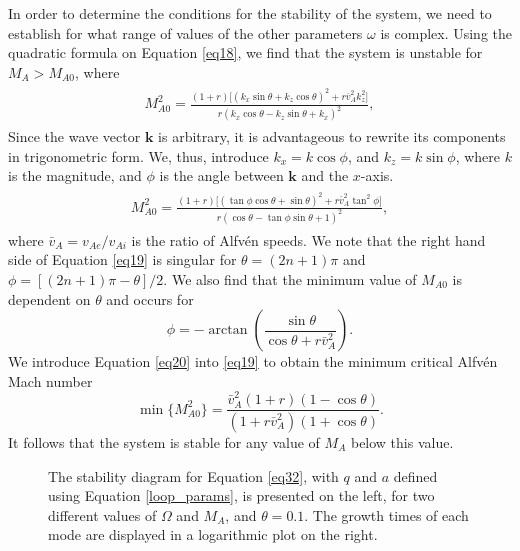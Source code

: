\documentclass[12pt]{ociamthesis}
\begin{document}
In order to determine the conditions for the stability of the system, we need to establish for what range of values of the other parameters $\omega$ is complex.
Using the quadratic formula on Equation \eqref{eq18}, we find that the system is unstable for $M_A > M_{A0}$, where
\begin{align}
\begin{split}
\label{eq18-1}
M_{A0}^2 = \frac{
(1 + r)
\big[ \left( k_x \sin\theta
+ k_z \cos\theta \right)^2
+ r \bar v_{A}^2 k_z^2 \big]
}{
r \left( k_x \cos\theta - k_z \sin\theta + k_x \right)^2
},
\end{split}
\end{align}
Since the wave vector $\mathbf{k}$ is arbitrary, it is advantageous to rewrite its components in trigonometric form.
We, thus, introduce $k_x = k \cos\phi$, and $k_z = k \sin\phi$, where $k$ is the magnitude, and $\phi$ is the angle between $\mathbf{k}$ and the $x$-axis.
\begin{align}
\begin{split}
\label{eq19}
M_{A0}^2 = \frac{
(1 + r)
\big[ \left( \tan\phi \cos\theta
+ \sin\theta \right)^2 + r \bar v_{A}^2 \tan^2\phi \big]
}{
r
\left( \cos\theta - \tan\phi \sin\theta + 1 \right)^2
},
\end{split}
\end{align}
where $\bar v_A = v_{Ae} / v_{Ai}$ is the ratio of Alfv\'en speeds.
We note that the right hand side of Equation \eqref{eq19} is singular for $\theta=(2n+1)\pi$ and $\phi = [(2n+1)\pi - \theta] / 2$. 
We also find that the minimum value of $M_{A0}$ is dependent on $\theta$ and occurs for
\begin{equation}
\label{eq20}
\phi = 
- \arctan \left(
\frac{ \sin\theta
}{
\cos\theta
+ r \bar v_{A}^2}
\right).
\end{equation}
We introduce Equation \eqref{eq20} into \eqref{eq19} to obtain the minimum critical Alfv\'en Mach number
\begin{equation}
\label{eq21}
\min \{ M_{A0}^2 \} = \frac{
\bar v_{A}^2 (1 + r) (1 - \cos\theta)}{
(1 + r \bar v_{A}^2) (1 + \cos\theta)}.
\end{equation}
It follows that the system is stable for any value of $M_A$ below this value.

\begin{figure*}[t]
\centering
{}
\hspace{3pt}
\caption{The stability diagram for Equation \eqref{eq32}, with $q$ and $a$ defined using Equation \eqref{loop_params}, is presented on the left, for two different values of $\Omega$ and $M_A$, and $\theta=0.1$. The growth times of each mode are displayed in a logarithmic plot on the right.}
\label{stability_growth_tilt}
\end{figure*}
\end{document}
